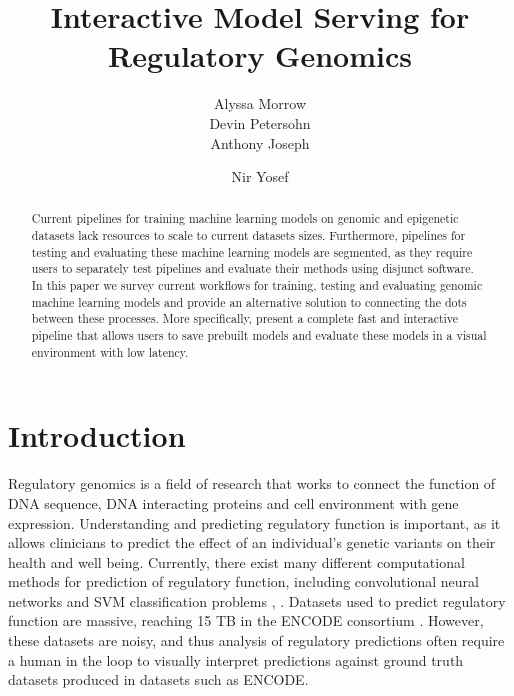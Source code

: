 \documentclass{sig-alternate-05-2015}
\begin{document}
\title{Interactive Model Serving for Regulatory Genomics}



\author{
\alignauthor
Alyssa Morrow \\
\alignauthor
Devin Petersohn \\
\alignauthor Anthony Joseph \\
\and  %
\alignauthor Nir Yosef \\
}

\maketitle
\begin{abstract}
Current pipelines for training machine learning models on genomic and epigenetic datasets lack resources to scale to current datasets sizes. Furthermore, pipelines for testing and evaluating these machine learning models are segmented, as they require users to separately test pipelines and evaluate their methods using disjunct software. In this paper we survey current workflows for training, testing and evaluating genomic machine learning models and provide an alternative solution to connecting the dots between these processes. More specifically, present a complete fast and interactive pipeline that allows users to save prebuilt models and evaluate these models in a visual environment with low latency.
\end{abstract}


\printccsdesc


\section{Introduction}
Regulatory genomics is a field of research that works to connect the function of DNA sequence, DNA interacting proteins and cell environment with gene expression. Understanding and predicting regulatory function is important, as it allows clinicians to predict the effect of an individual's genetic variants on their health and well being. Currently, there exist many different computational methods for prediction of regulatory function, including convolutional neural networks and SVM classification problems \cite{alipanahi2015predicting}, \cite{kelley2016basset}.  Datasets used to predict regulatory function are massive, reaching 15 TB in the ENCODE consortium \cite{encode2004encode}. However, these datasets are noisy, and thus analysis of regulatory predictions often require a human in the loop to visually interpret predictions against ground truth datasets produced in datasets such as ENCODE. \\
\end{document}
